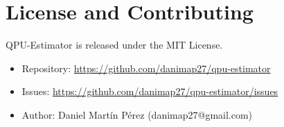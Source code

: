 \documentclass[11pt,a4paper]{article}
\begin{document}
\section{License and Contributing}

QPU-Estimator is released under the MIT License.

\begin{itemize}[leftmargin=2em]
    \item Repository: \url{https://github.com/danimap27/qpu-estimator}
    \item Issues: \url{https://github.com/danimap27/qpu-estimator/issues}
    \item Author: Daniel Mart\'{i}n P\'{e}rez (danimap27@gmail.com)
\end{itemize}
\end{document}
